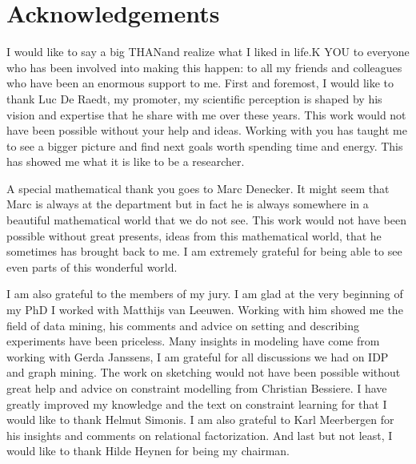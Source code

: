 \chapter{Acknowledgements} \label{ch:ack} I would like to say a big THANand realize what I liked in life.K YOU to everyone who has been involved into making this happen: to all my friends and colleagues who have been an enormous support to me.  
First and foremost, I would like to thank Luc De Raedt, my promoter, my scientific perception is shaped by his vision and expertise that he share with me over these years. This work would not have been possible without your help and ideas. Working with you has taught me to see a bigger picture and find next goals worth spending time and energy. This has showed me what it is like to be a researcher.

A special mathematical thank you goes to Marc Denecker. It might seem that Marc is always at the department but in fact he is always somewhere in  a beautiful mathematical world that we do not see. This work would not have been possible without great presents, ideas from this mathematical world, that he sometimes has brought back to me. I am extremely grateful for being able to see even parts of this wonderful world.

I am also grateful to the members of my jury. I am glad at the very beginning of my PhD I worked with Matthijs van Leeuwen. Working with him showed me the field of data mining, his comments and advice on setting and describing experiments have been priceless. Many insights in modeling have come from working with Gerda Janssens, I am grateful for all discussions we had on IDP and graph mining. The work on sketching would not have been possible without great help and advice on constraint modelling from Christian Bessiere. I have greatly improved my knowledge and the text on constraint learning for that I would like to thank Helmut Simonis. I am also grateful to Karl Meerbergen for his insights and comments on relational factorization. And last but not least, I would like to thank Hilde Heynen for being my chairman.

